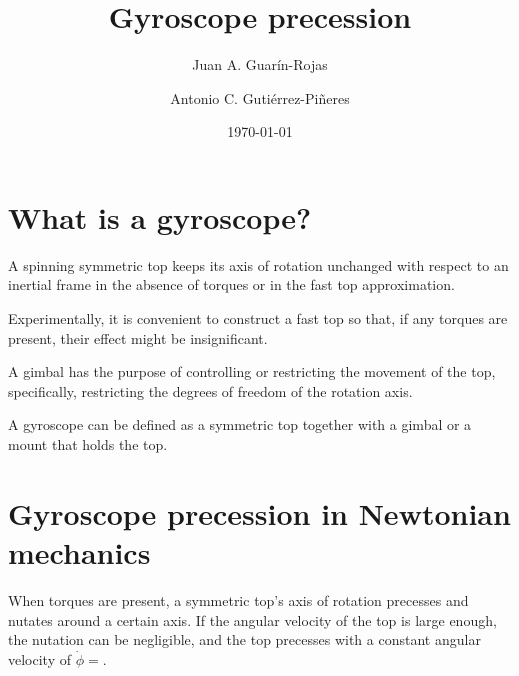 \documentclass[12pt, ams, nofootinbib]{revtex4}
\begin{document}

\title{Gyroscope precession}

\author{Juan A. Guarín-Rojas}

\author{Antonio C. Guti\'errez-Pi\~{n}eres}

\date{\today}



\maketitle

\section{What is a gyroscope?}

A spinning symmetric top keeps its axis of rotation unchanged with respect to an inertial frame in the absence of torques or in the fast top approximation.

Experimentally, it is convenient to construct a fast top so that, if any torques are present, their effect might be insignificant.

A gimbal has the purpose of controlling or restricting the movement of the top, specifically, restricting the degrees of freedom of the rotation axis.

A gyroscope can be defined as a symmetric top together with a gimbal or a mount that holds the top.



\section{Gyroscope precession in Newtonian mechanics}
When torques are present, a symmetric top's axis of rotation precesses and nutates around a certain axis. If the angular velocity of the top is large enough, the nutation can be negligible, and the top precesses with a constant angular velocity of $\dot{\phi}=$.
\end{document}
